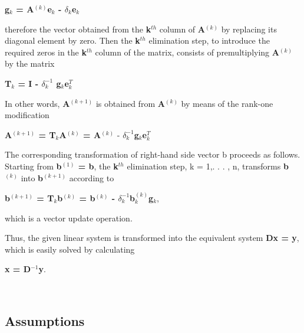 \documentclass[12pt]{article}
\begin{document}
\textbf{{g$_k$} = {A$^{(k)}$}{e$_k$} - $\delta_k${e$_k$}}

\vspace{.5cm}

therefore the vector obtained from the \textbf{{k$^{th}$}} column of \textbf{{A$^{(k)}$}} by
replacing its diagonal element by zero. Then the \textbf{{k$^{th}$}} elimination step, to
introduce the required zeros in the \textbf{{k$^{th}$}} column of the matrix, consists of
premultiplying \textbf{{A$^{(k)}$}} by the matrix

\vspace{.5cm}

\textbf{{T$_k$} = I - $\delta_k^{-1}$ {g$_k$}{e$_k^T$}}

\vspace{.5cm}

In other words, \textbf{{A$^{(k+1)}$}} is obtained from \textbf{{A$^{(k)}$}} by means of the
rank-one modification

\vspace{.5cm}

\textbf{A$^{(k+1)}$ = {T$_k$}{A$^{(k)}$} = {A$^{(k)}$}} -
\textbf{{$\delta_k^{-1}$}{g$_k$}{e$_k^T$}}

\vspace{.5cm}

The corresponding transformation of right-hand side vector b proceeds as
follows. Starting from \textbf{{b$^{(1)}$} = b}, the \textbf{{k$^{th}$}} elimination step, k = 1,.
. . , n, transforms \textbf{{b$^{(k)}$}} into \textbf{b$^{(k+1)}$} according to

\vspace{.5cm}

\textbf{{b$^{(k+1)}$} = {T$_k$}{b$^{(k)}$} = {b$^{(k)}$} -
$\delta_k^{-1}${b$^{(k)}_k$}{g$_k$}},

\vspace{.5cm}

which is a vector update operation. 

Thus, the given linear system is transformed into the equivalent system \textbf{Dx = y},
which is easily solved by calculating

\vspace{.5cm}

\textbf{x = {D$^{-1}$}y}.

~\newline

\subsection{Assumptions}
\end{document}
